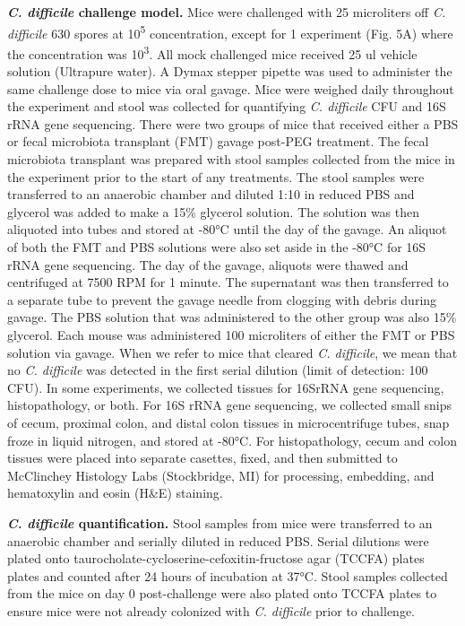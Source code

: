 \documentclass[
  11pt,
]{article}
\begin{document}
\textbf{\emph{C. difficile} challenge model.} Mice were challenged with
25 microliters off \emph{C. difficile} 630 spores at
10\textsuperscript{5} concentration, except for 1 experiment (Fig. 5A)
where the concentration was 10\textsuperscript{3}. All mock challenged
mice received 25 ul vehicle solution (Ultrapure water). A Dymax stepper
pipette was used to administer the same challenge dose to mice via oral
gavage. Mice were weighed daily throughout the experiment and stool was
collected for quantifying \emph{C. difficile} CFU and 16S rRNA gene
sequencing. There were two groups of mice that received either a PBS or
fecal microbiota transplant (FMT) gavage post-PEG treatment. The fecal
microbiota transplant was prepared with stool samples collected from the
mice in the experiment prior to the start of any treatments. The stool
samples were transferred to an anaerobic chamber and diluted 1:10 in
reduced PBS and glycerol was added to make a 15\% glycerol solution. The
solution was then aliquoted into tubes and stored at -80°C until the day
of the gavage. An aliquot of both the FMT and PBS solutions were also
set aside in the -80°C for 16S rRNA gene sequencing. The day of the
gavage, aliquots were thawed and centrifuged at 7500 RPM for 1 minute.
The supernatant was then transferred to a separate tube to prevent the
gavage needle from clogging with debris during gavage. The PBS solution
that was administered to the other group was also 15\% glycerol. Each
mouse was administered 100 microliters of either the FMT or PBS solution
via gavage. When we refer to mice that cleared \emph{C. difficile}, we
mean that no \emph{C. difficile} was detected in the first serial
dilution (limit of detection: 100 CFU). In some experiments, we
collected tissues for 16SrRNA gene sequencing, histopathology, or both.
For 16S rRNA gene sequencing, we collected small snips of cecum,
proximal colon, and distal colon tissues in microcentrifuge tubes, snap
froze in liquid nitrogen, and stored at -80°C. For histopathology, cecum
and colon tissues were placed into separate casettes, fixed, and then
submitted to McClinchey Histology Labs (Stockbridge, MI) for processing,
embedding, and hematoxylin and eosin (H\&E) staining.

\textbf{\emph{C. difficile} quantification.} Stool samples from mice
were transferred to an anaerobic chamber and serially diluted in reduced
PBS. Serial dilutions were plated onto
taurocholate-cycloserine-cefoxitin-fructose agar (TCCFA) plates plates
and counted after 24 hours of incubation at 37°C. Stool samples
collected from the mice on day 0 post-challenge were also plated onto
TCCFA plates to ensure mice were not already colonized with \emph{C.
difficile} prior to challenge.
\end{document}
